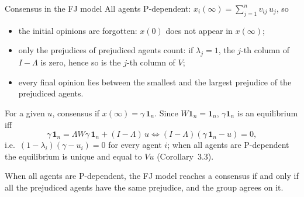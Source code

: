 \begin{frame}[label=bk-fj-consensus]{Consensus in the FJ model}
  \small
  All agents P-dependent: $x_i(\infty) = \sum_{j=1}^{n} v_{ij}\, u_j$, so
  \begin{itemize}
    \item the initial opinions are forgotten: $x(0)$ does not appear in $x(\infty)$;
    \item only the prejudices of prejudiced agents count: if $\lambda_j = 1$, the $j$-th
          column of $I - \Lambda$ is zero, hence so is the $j$-th column of $V$;
    \item every final opinion lies between the smallest and the largest prejudice of the
          prejudiced agents.
  \end{itemize}
  For a given $u$, consensus if $x(\infty) = \gamma\,\mathbf{1}_n$. Since
  $W\mathbf{1}_n = \mathbf{1}_n$, $\gamma\mathbf{1}_n$ is an equilibrium iff
  \[ \gamma\,\mathbf{1}_n = \Lambda W \gamma\,\mathbf{1}_n + (I - \Lambda)\, u
     \iff (I - \Lambda)(\gamma\,\mathbf{1}_n - u) = 0, \]
  i.e.\ $(1 - \lambda_i)(\gamma - u_i) = 0$ for every agent $i$; when all agents are
  P-dependent the equilibrium is unique and equal to $Vu$ (Corollary~3.3).
  \begin{alertblock}{}
    When all agents are P-dependent, the FJ model reaches a consensus if and only if all
    the prejudiced agents have the same prejudice, and the group agrees on it.
  \end{alertblock}
\end{frame}

